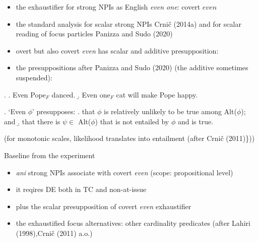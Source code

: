 \documentclass[
  ignorenonframetext,
]{beamer}
\providecommand{\tightlist}{%
  \setlength{\itemsep}{0pt}\setlength{\parskip}{0pt}}\usepackage{longtable,booktabs,array}
\begin{document}
\begin{frame}
\begin{itemize}
\tightlist
\item
  the exhaustifier for strong NPIs as English \emph{even one}: covert
  \(even\)
\item
  the standard analysis for scalar strong NPIs Crnič (2014a) and for
  scalar reading of focus particles Panizza and Sudo (2020)
\item
  overt but also covert \emph{even} has scalar \Next[a] and additive
  \Next[b] presupposition:
\item
  the presuppositions after Panizza and Sudo (2020) (the additive
  sometimes suspended):
\end{itemize}

\ex. \a. Even Pope\(_F\) danced. \b. Even one\(_F\) cat will make Pope
happy.

\ex. `Even \(\phi\)' presupposes: \a. that \(\phi\) is relatively
unlikely to be true among Alt(\(\phi\)); and \b. that there is
\(\psi \in\) Alt(\(\phi\)) that is not entailed by \(\phi\) and is true.

\footnotesize(for monotonic scales, likelihood translates into
entailment (after Crnič (2011)\}))\normalsize
\end{frame}

\begin{frame}
\begin{block}{Baseline from the experiment}
\protect\hypertarget{baseline-from-the-experiment}{}
\begin{itemize}
\tightlist
\item
  \emph{ani} strong NPIs associate with covert \emph{even} (scope:
  propositional level)
\item
  it reqires DE both in TC and non-at-issue
\item
  plus the scalar presupposition of covert \emph{even} exhaustifier
\item
  the exhaustified focus alternatives: other cardinality predicates
  (after Lahiri (1998),Crnič (2011) a.o.)
\end{itemize}
\end{block}
\end{frame}
\end{document}

